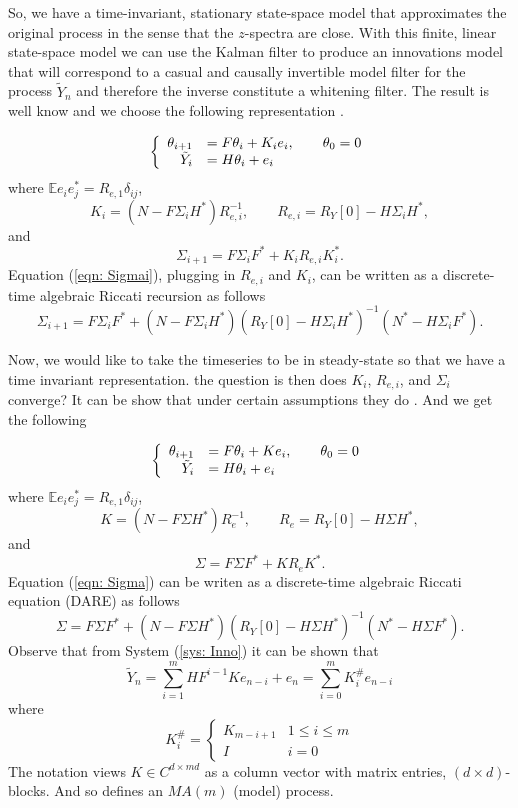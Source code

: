\documentclass[12pt]{amsart}
\newcommand{\E}{\mathbb{E}}
\begin{document}
So, we have a time-invariant, stationary state-space model that approximates the original process in the sense that the $z$-spectra are close. With this finite, linear state-space model we can use the Kalman filter to produce an innovations model that will correspond to a casual and causally invertible model filter for the process $\tilde{Y}_n$ and therefore the inverse constitute a whitening filter. The result is well know and we choose the following representation \cite[p.~335]{kailath2000}.

$$\left\{\begin{array}{ r l}
\theta_{i+1} &= F\theta_i + K_ie_i,\qquad \theta_0 = 0\\
\tilde{Y}_i &= H\theta_i + e_i
\end{array}\right.$$
where $\E e_ie_j^* =  R_{e,1}\delta_{ij}$,
$$K_i = (N - F\Sigma_i H^*)R_{e,i}^{-1}, \qquad R_{e,i} = R_Y[0] - H\Sigma_i H^*,$$
and 
\begin{equation} \Sigma_{i+1} = F\Sigma_i F^* + K_iR_{e,i}K_i^*. \label{eqn: Sigmai}\end{equation}
Equation (\ref{eqn: Sigmai}), plugging in $R_{e,i}$ and $K_i$, can be written as a discrete-time algebraic Riccati recursion as follows
\begin{equation} 
\Sigma_{i+1} = F\Sigma_i F^* + (N - F\Sigma_i H^*)( R_Y[0] - H\Sigma_i H^*)^{-1}(N^* - H\Sigma_i F^*). 
\label{eqn: DARR}
\end{equation}

Now, we would like to take the timeseries to be in steady-state so that we have a time invariant representation. the question is then does $K_i$, $R_{e,i}$, and $\Sigma_i$ converge? It can be show that under certain assumptions they do \cite[ch.~14]{kailath2000}. And we get the following 

\begin{equation}
\left\{\begin{array}{ r l}
\theta_{i+1} &= F\theta_i + Ke_i,\qquad \theta_0 = 0\\
\tilde{Y}_i &= H\theta_i + e_i
\end{array}\right.
\label{sys: Inno}
\end{equation}
where $\E e_ie_j^* =  R_{e,1}\delta_{ij}$,
$$K = (N - F\Sigma H^*)R_{e}^{-1}, \qquad R_{e} = R_Y[0] - H\Sigma H^*,$$
and 
\begin{equation} \Sigma = F\Sigma F^* + KR_{e}K^*. \label{eqn: Sigma} \end{equation}
Equation (\ref{eqn: Sigma}) can be writen as a discrete-time algebraic Riccati equation (DARE) as follows
\begin{equation} 
\Sigma = F\Sigma F^* + (N - F\Sigma H^*)( R_Y[0] - H\Sigma H^*)^{-1}(N^* - H\Sigma F^*). 
\label{eqn: DARE}
\end{equation}
Observe that from System (\ref{sys: Inno}) it can be shown that $$\tilde{Y}_n = \sum_{i=1}^{m} HF^{i-1}Ke_{n-i} + e_n = \sum_{i = 0}^{m} K^{\#}_ie_{n-i}$$
where $$K^{\#}_i = \begin{cases}
K_{m-i+1} & 1\le i \le m\\
I & i = 0\end{cases}$$
The notation views $K \in C^{d\times md}$ as a column vector with matrix entries, $(d\times d)$-blocks.
And so defines an $MA(m)$ (model) process. 
\end{document}
